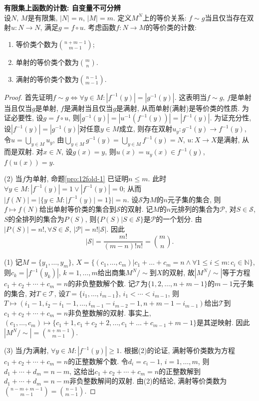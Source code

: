 \begin{pro}\textbf{有限集上函数的计数: 自变量不可分辨}\\
设$N$, $M$是有限集, $|N|=n$, $|M|=m$. 定义$M^N$上的等价关系: $f\sim g$当且仅当存在双射$u: N\to N$, 满足$g = f \circ u$. 考虑函数$f:N\to M$的等价类的计数:
\begin{enumerate}
\item 等价类个数为$\binom{n+m-1}{m-1}$;
\item 单射的等价类个数为$\binom{m}{n}$. 
\item 满射的等价类个数为$\binom{n-1}{m-1}$.
\end{enumerate}
\label{pro:12fold-2}
\end{pro}
\begin{proof}
首先证明$f\sim g \iff \forall y\in M: |f^{-1}(y)|=|g^{-1}(y)|$. 这表明当$f\sim g$, $f$是单射当且仅当$g$是单射, $f$是满射当且仅当$g$是满射, 从而单射(满射)是等价类的性质. 为证必要性, 设$g=f\circ u$, 则$|g^{-1}(y)|=|u^{-1}(f^{-1}(y))|=|f^{-1}(y)|$. 为证充分性, 设$|f^{-1}(y)|=|g^{-1}(y)|$对任意$y\in M$成立, 则存在双射$u_y: g^{-1}(y)\to f^{-1}(y)$, 令$u=\bigcup_{y\in M} u_y$, 由$\bigcup_{y\in M} g^{-1}(y)=\bigcup_{y\in M} f^{-1}(y)=N$, $u: X\to X$是满射, 从而是双射. 对$x\in N$, 设$g(x)=y$, 则$u(x)=u_y(x)\in f^{-1}(y)$, $f(u(x))=y$. 

\par (2) 当$f$为单射, 命题\ref{pro:12fold-1} 已证明$n\le m$. 此时$\forall y\in M: |f^{-1}(y)|=1\lor |f^{-1}(y)|=0$; 从而$|f(N)|=|\{y\in M:  |f^{-1}(y)|=1\}|=n$. 设$\mathcal{S}$为$M$的$n$元子集的集合, 则$f\mapsto f(N)$给出单射等价类的集合到$\mathcal{S}$的双射. 记$M$的$n$元排列的集合为$\mathcal{P}$, 对$S\in \mathcal{S}$, $S$的全排列的集合为$P(S)$, 则$\{P(S)\vert S\in \mathcal{S}\}$是$\mathcal{P}$的一个划分. 由$|P(S)|=n!, \forall S\in \mathcal{S}$, $|\mathcal{P}|=n!|\mathcal{S}|$. 因此
\begin{equation}
    |\mathcal{S}|=\frac{m!}{(m-n)!n!}=\binom{m}{n}. 
\end{equation}

\par (1) 记$M=\{y_1,\dots,y_m\}$, $X=\{(c_1,\dots,c_m)\vert  c_1+\dots+c_m=n \land \forall 1\le i\le m: c_i\in \mathbb{N}\}$, 则$c_k=|f^{-1}(y_k)|$, $k=1,\dots,m$给出商集$M^N/\sim$到$X$的双射, 故$|M^N/\sim|$等于方程$c_1+c_2+\cdots+c_m=n$的非负整数解个数. 记$\mathcal{T}$为$\{1,2,\dots,n+m-1\}$的$m-1$元子集的集合, 对$T\in \mathcal{T}$, 设$T=\{i_1,\dots, i_{m-1}\}$, $i_1<\cdots<i_{m-1}$, 则$T\mapsto (i_1-1, i_2-i_1-1,\dots, i_{m-1}-i_{m-2}-1, n+m-1-i_{m-1})$给出$\mathcal{T}$到$c_1+c_2+\cdots+c_m=n$非负整数解的双射. 事实上, $(c_1,\dots,c_m)\mapsto \{c_1+1, c_1+c_2+2, \dots, c_1+\dots+c_{m-1}+m-1\}$是其逆映射. 因此$|M^N/\sim|=\binom{n+m-1}{m-1}$. 

\par (3) 当$f$为满射, $\forall y\in M: |f^{-1}(y)|\ge 1$. 根据(2)的论证, 满射等价类数为方程$c_1+c_2+\cdots+c_m=n$的正整数解个数. 令$d_i=c_i-1$, $i=1,\dots,m$, 则$d_1+\cdots+d_m=n-m$, 这给出$c_1+c_2+\cdots+c_m=n$的正整数解到$d_1+\cdots+d_m=n-m$非负整数解间的双射. 由(2)的结论, 满射等价类数为$\binom{n-m+m-1}{m-1}=\binom{n-1}{m-1}$. 
\end{proof}

